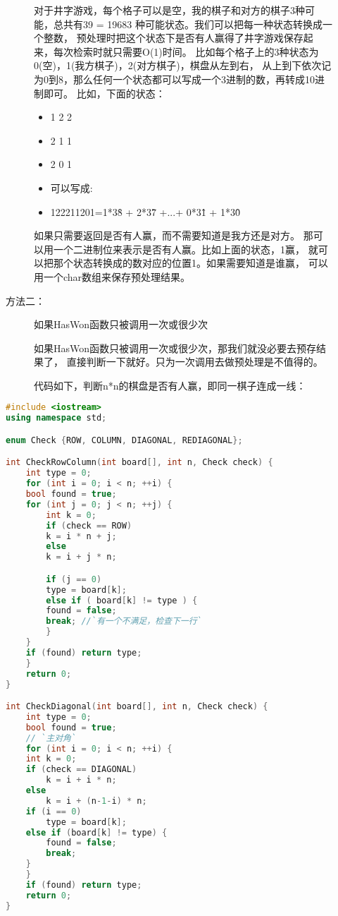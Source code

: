 \begin{description}
\begin{description}
对于井字游戏，每个格子可以是空，我的棋子和对方的棋子3种可能，总共有39 = 19683 种可能状态。我们可以把每一种状态转换成一个整数， 预处理时把这个状态下是否有人赢得了井字游戏保存起来，每次检索时就只需要O(1)时间。 比如每个格子上的3种状态为0(空)，1(我方棋子)，2(对方棋子)，棋盘从左到右， 从上到下依次记为0到8，那么任何一个状态都可以写成一个3进制的数，再转成10进制即可。 比如，下面的状态：
\begin{itemize}
  \itemsep=-3pt
\item 1 2 2
\item 2 1 1
\item 2 0 1
\item 可以写成:
\item 122211201=1*3\^8 + 2*3\^7 +...+ 0*3\^1 + 1*3\^0
\end{itemize}
如果只需要返回是否有人赢，而不需要知道是我方还是对方。 那可以用一个二进制位来表示是否有人赢。比如上面的状态，1赢， 就可以把那个状态转换成的数对应的位置1。如果需要知道是谁赢， 可以用一个char数组来保存预处理结果。

\item[方法二：] 如果HasWon函数只被调用一次或很少次

如果HasWon函数只被调用一次或很少次，那我们就没必要去预存结果了， 直接判断一下就好。只为一次调用去做预处理是不值得的。

代码如下，判断n*n的棋盘是否有人赢，即同一棋子连成一线：
\end{description}
\begin{lstlisting}[language=C++]
#include <iostream>
using namespace std;

enum Check {ROW, COLUMN, DIAGONAL, REDIAGONAL};

int CheckRowColumn(int board[], int n, Check check) {
    int type = 0;
    for (int i = 0; i < n; ++i) {
	bool found = true; 
	for (int j = 0; j < n; ++j) {
	    int k = 0;
	    if (check == ROW)
		k = i * n + j;
	    else 
		k = i + j * n;

	    if (j == 0)
		type = board[k];
	    else if ( board[k] != type ) {
		found = false;
		break; //`有一个不满足，检查下一行`
	    }
	}
	if (found) return type;
    }
    return 0;
}

int CheckDiagonal(int board[], int n, Check check) {
    int type = 0;
    bool found = true;
    // `主对角`
    for (int i = 0; i < n; ++i) {
	int k = 0;
	if (check == DIAGONAL)
	    k = i + i * n;
	else 
	    k = i + (n-1-i) * n;
	if (i == 0) 
	    type = board[k];
	else if (board[k] != type) {
	    found = false;
	    break;
	}
    }
    if (found) return type;
    return 0;
}


\end{lstlisting}
\end{description}
